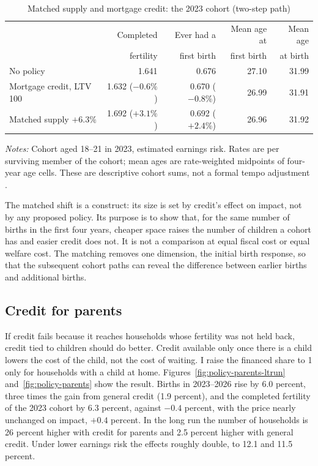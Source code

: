 \begin{table}[t]
\centering
\caption{Matched supply and mortgage credit: the 2023 cohort (two-step path)}
\label{tab:policy-tempo}
\small
\begin{tabularx}{\textwidth}{@{}Xrrrr@{}}
\toprule
 & Completed & Ever had a & Mean age at & Mean age \\
 & fertility & first birth & first birth & at birth \\
\midrule
No policy & 1.641 & 0.676 & 27.10 & 31.99 \\
Mortgage credit, LTV 100 & 1.632 ($-0.6\%$) & 0.670 ($-0.8\%$) & 26.99 & 31.91 \\
Matched supply $+6.3\%$ & 1.692 ($+3.1\%$) & 0.692 ($+2.4\%$) & 26.96 & 31.92 \\
\bottomrule
\end{tabularx}
\par\smallskip
\begin{minipage}{0.95\linewidth}
\footnotesize\textit{Notes:} Cohort aged 18--21 in 2023, estimated earnings
risk. Rates are per surviving member of the cohort; mean ages are
rate-weighted midpoints of four-year age cells. These are descriptive cohort
sums, not a formal tempo adjustment \citep{bongaartsFeeneyQuantumTempo1998}.
\end{minipage}
\end{table}

The matched shift is a construct: its size is set by credit's effect on
impact, not by any proposed policy. Its purpose is to show that, for the same
number of births in the first four years, cheaper space raises the number of
children a cohort has and easier credit does not. It is not a comparison at
equal fiscal cost or equal welfare cost. The matching removes one dimension,
the initial birth response, so that the subsequent cohort paths can reveal
the difference between earlier births and additional births.

\subsection{Credit for parents}
\label{sec:policy-parents}

If credit fails because it reaches households whose fertility was not held
back, credit tied to children should do better. Credit available only once
there is a child lowers the cost of the child, not the cost of waiting. I raise
the financed share to 1 only for households with a child at home.
Figures~\ref{fig:policy-parents-ltrun} and~\ref{fig:policy-parents} show the
result. Births in 2023--2026 rise by 6.0 percent, three times the gain from
general credit (1.9 percent), and the completed fertility of the 2023 cohort by
6.3 percent, against $-0.4$ percent, with the price nearly unchanged on impact,
$+0.4$ percent. In the long run the number of households is 26 percent higher
with credit for parents and 2.5 percent higher with general credit. Under
lower earnings risk the effects roughly double, to 12.1 and 11.5 percent.

